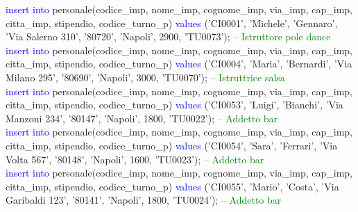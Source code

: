 \documentclass{article}
\begin{document}
\begin{flushleft}
{        \hspace*{0.5em}\textcolor{blue}{insert into} personale(codice\_imp, nome\_imp, cognome\_imp, via\_imp, cap\_imp, \hspace*{0.5em}citta\_imp, stipendio, codice\_turno\_p) \textcolor{blue}{values} ('CI0001', 'Michele', 'Gennaro', 'Via Salerno 310', '80720', 'Napoli', 2900, 'TU0073'); \hspace*{0.5em} \textcolor{green}{-- Istruttore pole dance} \\
        \vspace{2mm}
        \hspace*{0.5em}\textcolor{blue}{insert into} personale(codice\_imp, nome\_imp, cognome\_imp, via\_imp, cap\_imp, \hspace*{0.5em}citta\_imp, stipendio, codice\_turno\_p) \textcolor{blue}{values} ('CI0004', 'Maria', 'Bernardi', 'Via\hspace*{0.5em} Milano 295', \hspace*{0.5em}'80690', 'Napoli', 3000, 'TU0070'); \hspace*{0.5em} \textcolor{green}{-- Istruttrice salsa} \\
        \hspace*{0.5em}\textcolor{blue}{insert into} personale(codice\_imp, nome\_imp, cognome\_imp, via\_imp, cap\_imp, \hspace*{0.5em}citta\_imp, stipendio, codice\_turno\_p) \textcolor{blue}{values} ('CI0053', 'Luigi', 'Bianchi', 'Via \hspace*{0.5em}Manzoni 234', '80147', 'Napoli', 1800, 'TU0022'); \hspace*{0.5em} \textcolor{green}{-- Addetto bar} \\
        \vspace{2mm}
        \hspace*{0.5em}\textcolor{blue}{insert into} personale(codice\_imp, nome\_imp, cognome\_imp, via\_imp, cap\_imp, \hspace*{0.5em}citta\_imp, stipendio, codice\_turno\_p) \textcolor{blue}{values} ('CI0054', 'Sara', 'Ferrari', 'Via \hspace*{0.5em}Volta 567', \hspace*{0.5em}'80148', 'Napoli', 1600, 'TU0023'); \hspace*{0.5em} \textcolor{green}{-- Addetto bar} \\
        \vspace{2mm}
        \hspace*{0.5em}\textcolor{blue}{insert into} personale(codice\_imp, nome\_imp, cognome\_imp, via\_imp, cap\_imp, \hspace*{0.5em}citta\_imp, stipendio, codice\_turno\_p) \textcolor{blue}{values} ('CI0055', 'Mario', 'Costa', 'Via \hspace*{0.5em}Garibaldi 123', \hspace*{0.5em}'80141', 'Napoli', 1800, 'TU0024'); \hspace*{0.5em} \textcolor{green}{-- Addetto bar} \\
}
\end{flushleft}
\end{document}
